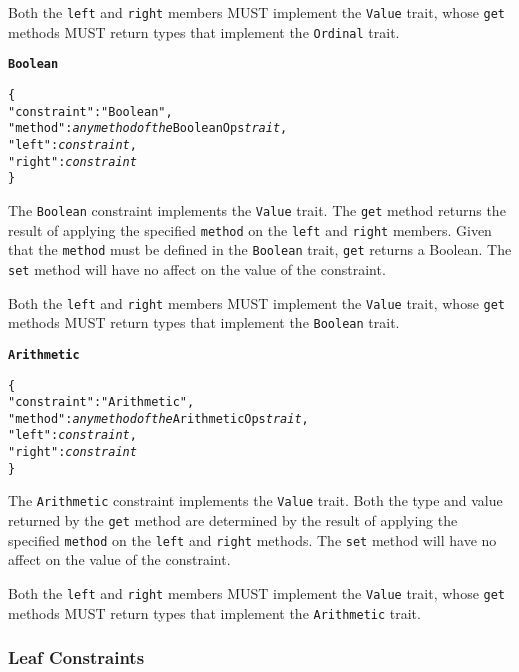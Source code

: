 \documentclass[10pt,twocolumn,a4paper]{article}
\newcommand{\code}[1]{\texttt{#1}}
\begin{document}
Both the \code{left} and \code{right} members MUST implement the \code{Value} trait, whose
\code{get} methods MUST return types that implement the \code{Ordinal} trait.

\textbf{\texttt{Boolean}}

\footnotesize
\begin{alltt}
  \{
    "constraint"   : "Boolean",
    "method"       : \emph{any method of the} BooleanOps \emph{trait},
    "left"         : \emph{constraint},
    "right"        : \emph{constraint}
  \}
\end{alltt}
\normalsize

The \code{Boolean} constraint implements the \code{Value} trait. The \code{get} method
returns the result of applying the specified \code{method} on the \code{left} and
\code{right} members. Given that the \code{method} must be defined in the \code{Boolean}
trait, \code{get} returns a Boolean. The \code{set} method will have no affect on the
value of the constraint.

Both the \code{left} and \code{right} members MUST implement the \code{Value} trait, whose
\code{get} methods MUST return types that implement the \code{Boolean} trait.

\textbf{\texttt{Arithmetic}}

\footnotesize
\begin{alltt}
  \{
    "constraint"   : "Arithmetic",
    "method"       : \emph{any method of the} ArithmeticOps \emph{trait},
    "left"         : \emph{constraint},
    "right"        : \emph{constraint}
  \}
\end{alltt}
\normalsize

The \code{Arithmetic} constraint implements the \code{Value} trait. Both the type and
value returned by the \code{get} method are determined by the result of applying the
specified \code{method} on the \code{left} and \code{right} methods. The \code{set} method
will have no affect on the value of the constraint.

Both the \code{left} and \code{right} members MUST implement the \code{Value} trait, whose
\code{get} methods MUST return types that implement the \code{Arithmetic} trait.

\subsubsection{Leaf Constraints}
\end{document}
